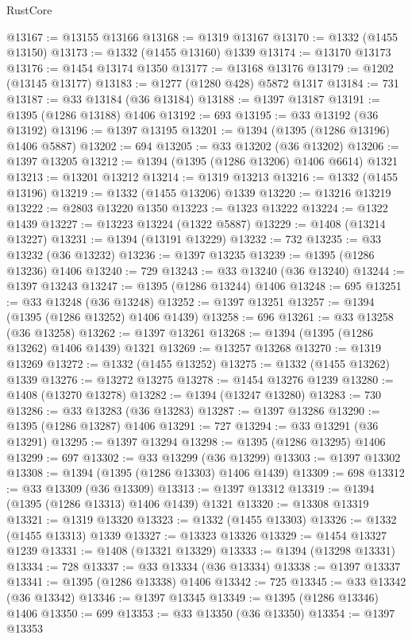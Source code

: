 \begin{lexlean}{RustCore}
\begin{coremodule}
@13167 := @13155 @13166
@13168 := @1319 @13167
@13170 := @1332 (@1455 @13150)
@13173 := @1332 (@1455 @13160) @1339
@13174 := @13170 @13173
@13176 := @1454 @13174 @1350
@13177 := @13168 @13176
@13179 := @1202 (@13145 @13177)
@13183 := @1277 (@1280 @428) @5872 @1317
@13184 := 731
@13187 := @33 @13184 (@36 @13184)
@13188 := @1397 @13187
@13191 := @1395 (@1286 @13188) @1406
@13192 := 693
@13195 := @33 @13192 (@36 @13192)
@13196 := @1397 @13195
@13201 := @1394 (@1395 (@1286 @13196) @1406 @5887)
@13202 := 694
@13205 := @33 @13202 (@36 @13202)
@13206 := @1397 @13205
@13212 := @1394 (@1395 (@1286 @13206) @1406 @6614) @1321
@13213 := @13201 @13212
@13214 := @1319 @13213
@13216 := @1332 (@1455 @13196)
@13219 := @1332 (@1455 @13206) @1339
@13220 := @13216 @13219
@13222 := @2803 @13220 @1350
@13223 := @1323 @13222
@13224 := @1322 @1439
@13227 := @13223 @13224 (@1322 @5887)
@13229 := @1408 (@13214 @13227)
@13231 := @1394 (@13191 @13229)
@13232 := 732
@13235 := @33 @13232 (@36 @13232)
@13236 := @1397 @13235
@13239 := @1395 (@1286 @13236) @1406
@13240 := 729
@13243 := @33 @13240 (@36 @13240)
@13244 := @1397 @13243
@13247 := @1395 (@1286 @13244) @1406
@13248 := 695
@13251 := @33 @13248 (@36 @13248)
@13252 := @1397 @13251
@13257 := @1394 (@1395 (@1286 @13252) @1406 @1439)
@13258 := 696
@13261 := @33 @13258 (@36 @13258)
@13262 := @1397 @13261
@13268 := @1394 (@1395 (@1286 @13262) @1406 @1439) @1321
@13269 := @13257 @13268
@13270 := @1319 @13269
@13272 := @1332 (@1455 @13252)
@13275 := @1332 (@1455 @13262) @1339
@13276 := @13272 @13275
@13278 := @1454 @13276 @1239
@13280 := @1408 (@13270 @13278)
@13282 := @1394 (@13247 @13280)
@13283 := 730
@13286 := @33 @13283 (@36 @13283)
@13287 := @1397 @13286
@13290 := @1395 (@1286 @13287) @1406
@13291 := 727
@13294 := @33 @13291 (@36 @13291)
@13295 := @1397 @13294
@13298 := @1395 (@1286 @13295) @1406
@13299 := 697
@13302 := @33 @13299 (@36 @13299)
@13303 := @1397 @13302
@13308 := @1394 (@1395 (@1286 @13303) @1406 @1439)
@13309 := 698
@13312 := @33 @13309 (@36 @13309)
@13313 := @1397 @13312
@13319 := @1394 (@1395 (@1286 @13313) @1406 @1439) @1321
@13320 := @13308 @13319
@13321 := @1319 @13320
@13323 := @1332 (@1455 @13303)
@13326 := @1332 (@1455 @13313) @1339
@13327 := @13323 @13326
@13329 := @1454 @13327 @1239
@13331 := @1408 (@13321 @13329)
@13333 := @1394 (@13298 @13331)
@13334 := 728
@13337 := @33 @13334 (@36 @13334)
@13338 := @1397 @13337
@13341 := @1395 (@1286 @13338) @1406
@13342 := 725
@13345 := @33 @13342 (@36 @13342)
@13346 := @1397 @13345
@13349 := @1395 (@1286 @13346) @1406
@13350 := 699
@13353 := @33 @13350 (@36 @13350)
@13354 := @1397 @13353

\end{coremodule}
\end{lexlean}

